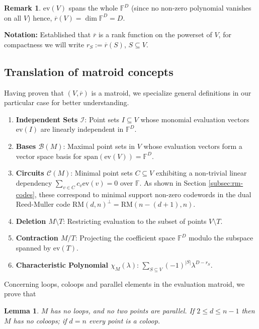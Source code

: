 \documentclass[11pt,a4paper]{article}
\newtheorem{lemma}[theorem]{Lemma}
\theoremstyle{definition}
\newtheorem{remark}[theorem]{Remark}
\newcommand{\FF}{\mathbb{F}}
\begin{document}
\begin{remark}
    $\mathrm{ev}(V)$ spans the whole $\FF^D$ (since no non-zero polynomial vanishes on all $V$) hence, $\overline{r}(V) = \dim\FF^D = D$. 
\end{remark}

\textbf{Notation:} Established that $\overline{r}$ is a rank function on the powerset of $V$, for compactness we will write $r_S := \overline{r}(S)$, $S \subseteq V$. \\

\subsection{Translation of matroid concepts}

Having proven that $(V, \overline{r})$ is a matroid, we specialize general definitions in our particular case for better understanding.

\begin{enumerate}
    \item \textbf{Independent Sets $\mathcal{I}$}: Point sets $I \subseteq V$ whose monomial evaluation vectors $\mathrm{ev}(I)$ are linearly independent in $\mathbb{F}^D$.
    \item \textbf{Bases $\mathcal{B}(M)$}: Maximal point sets in $V$ whose evaluation vectors form a vector space basis for $\mathrm{span}(\mathrm{ev}(V)) = \mathbb{F}^D$.
    \item \textbf{Circuits $\mathcal{C}(M)$}: Minimal point sets $C \subseteq V$ exhibiting a non-trivial linear dependency $\sum_{v \in C} c_v \mathrm{ev}(v) = 0$ over $\mathbb{F}$. As shown in Section \ref{subsec:rm-codes}, these correspond to minimal support non-zero codewords in the dual Reed-Muller code $\mathrm{RM}(d, n)^\perp = \mathrm{RM}(n - (d + 1), n)$.
    \item \textbf{Deletion $M \setminus T$}: Restricting evaluation to the subset of points $V \setminus T$.
    \item \textbf{Contraction $M/T$}: Projecting the coefficient space $\mathbb{F}^D$ modulo the subspace spanned by $\mathrm{ev}(T)$.
    \item \textbf{Characteristic Polynomial $\chi_M(\lambda)$}: $\sum_{S \subseteq V} (-1)^{|S|} \lambda^{D - r_S}$.
\end{enumerate}

Concerning loops, coloops and parallel elements in the evaluation matroid, we prove that 

\begin{lemma}\label{lem:coloop}
$M$ has no loops, and no two points are parallel. If $2 \le d\le n-1$ then $M$ has no coloops; if $d=n$ every point is a coloop.
\end{lemma}
\end{document}
